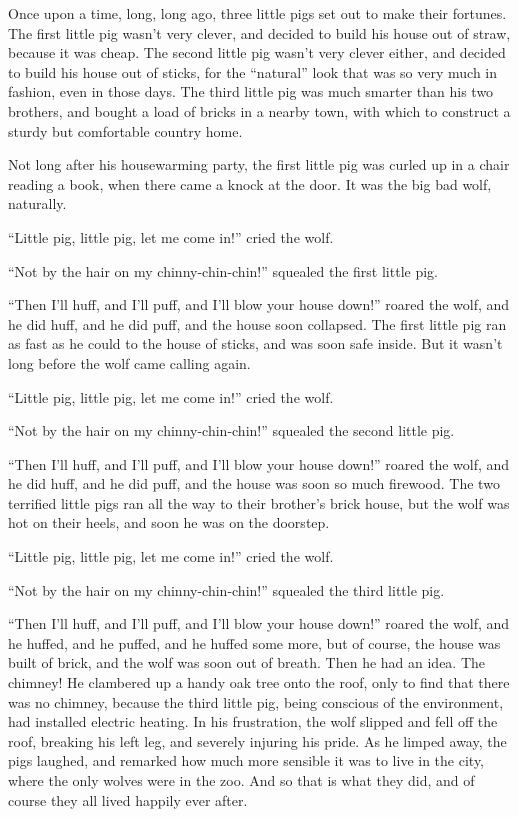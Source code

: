 \documentclass[]{article}
\begin{document}
Once upon a time, long, long ago, three little pigs set out to make
their fortunes. The first little pig wasn't very clever, and decided to
build his house out of straw, because it was cheap. The second little
pig wasn't very clever either, and decided to build his house out of
sticks, for the ``natural'' look that was so very much in fashion, even
in those days. The third little pig was much smarter than his two
brothers, and bought a load of bricks in a nearby town, with which to
construct a sturdy but comfortable country home.

Not long after his housewarming party, the first little pig was curled
up in a chair reading a book, when there came a knock at the door. It
was the big bad wolf, naturally.

``Little pig, little pig, let me come in!'' cried the wolf.

``Not by the hair on my chinny-chin-chin!'' squealed the first little
pig.

``Then I'll huff, and I'll puff, and I'll blow your house down!'' roared
the wolf, and he did huff, and he did puff, and the house soon
collapsed. The first little pig ran as fast as he could to the house of
sticks, and was soon safe inside. But it wasn't long before the wolf
came calling again.

``Little pig, little pig, let me come in!'' cried the wolf.

``Not by the hair on my chinny-chin-chin!'' squealed the second little
pig.

``Then I'll huff, and I'll puff, and I'll blow your house down!'' roared
the wolf, and he did huff, and he did puff, and the house was soon so
much firewood. The two terrified little pigs ran all the way to their
brother's brick house, but the wolf was hot on their heels, and soon he
was on the doorstep.

``Little pig, little pig, let me come in!'' cried the wolf.

``Not by the hair on my chinny-chin-chin!'' squealed the third little
pig.

``Then I'll huff, and I'll puff, and I'll blow your house down!'' roared
the wolf, and he huffed, and he puffed, and he huffed some more, but of
course, the house was built of brick, and the wolf was soon out of
breath. Then he had an idea. The chimney! He clambered up a handy oak
tree onto the roof, only to find that there was no chimney, because the
third little pig, being conscious of the environment, had installed
electric heating. In his frustration, the wolf slipped and fell off the
roof, breaking his left leg, and severely injuring his pride. As he
limped away, the pigs laughed, and remarked how much more sensible it
was to live in the city, where the only wolves were in the zoo. And so
that is what they did, and of course they all lived happily ever after.
\end{document}
